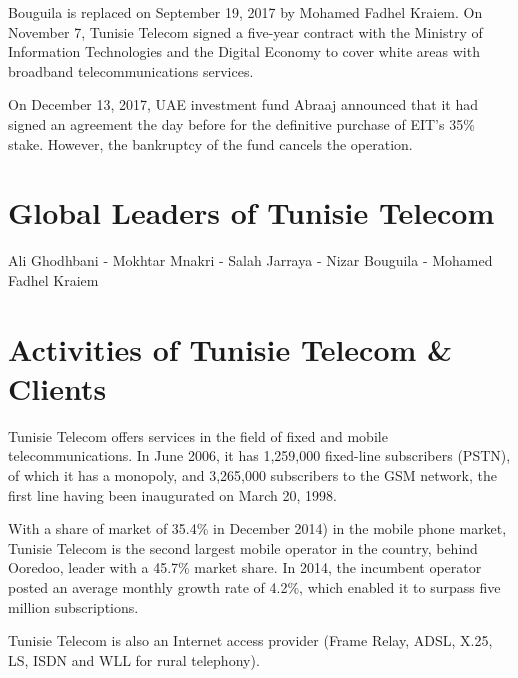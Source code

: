Bouguila is replaced on September 19, 2017 by Mohamed Fadhel Kraiem. On November 7, Tunisie Telecom signed a five-year contract with the Ministry of Information Technologies and the Digital Economy to cover white areas with broadband telecommunications services.

On December 13, 2017, UAE investment fund Abraaj announced that it had signed an agreement the day before for the definitive purchase of EIT's 35\% stake. However, the bankruptcy of the fund cancels the operation.





{}

\section{Global Leaders of Tunisie Telecom}%
Ali Ghodhbani - Mokhtar Mnakri - Salah Jarraya - Nizar Bouguila - Mohamed Fadhel Kraiem



\section{Activities of Tunisie Telecom \& Clients}%

Tunisie Telecom offers services in the field of fixed and mobile telecommunications. 
In June 2006, it has 1,259,000 fixed-line subscribers (PSTN), of which it has a monopoly, and 3,265,000 subscribers to the GSM network, the first line having been inaugurated on March 20, 1998.

With a share of market of 35.4\% in December 2014) in the mobile phone market, Tunisie Telecom is the second largest mobile operator in the country, behind Ooredoo, leader with a 45.7\% market share. 
In 2014, the incumbent operator posted an average monthly growth rate of 4.2\%, which enabled it to surpass five million subscriptions. 

Tunisie Telecom is also an Internet access provider (Frame Relay, ADSL, X.25, LS, ISDN and WLL for rural telephony).

